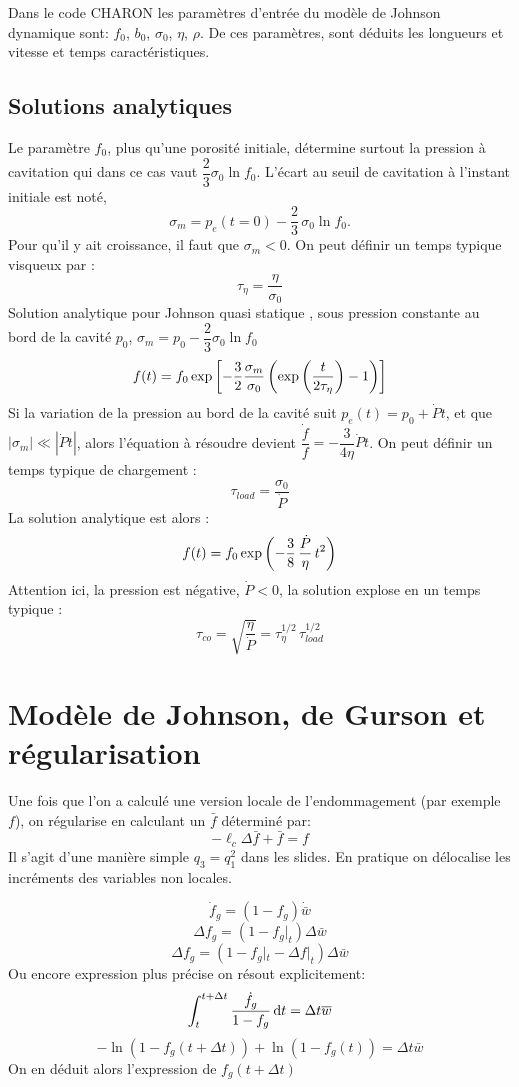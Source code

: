 \documentclass[10pt]{book}
\begin{document}
Dans le code CHARON les paramètres d'entrée du modèle de Johnson dynamique sont: $f_{0}$, $b_{0}$, $\sigma_{0}$, $\eta$, $\rho$. 
De ces paramètres, sont déduits les longueurs et vitesse et temps caractéristiques.
\subsection{Solutions analytiques}
Le paramètre $f_0$, plus qu'une porosité initiale, détermine surtout la pression à cavitation qui dans ce cas vaut $\displaystyle \dfrac{2}{3}\sigma_0 \ln{f_0}$.  L'écart au seuil de cavitation à l'instant initiale est noté,
$$\sigma_m = p_e(t=0)-\dfrac{2}{3}\,\sigma_0\ln{f_0}.$$
Pour qu'il y ait croissance, il faut que $\sigma_m<0$. On peut définir un temps typique visqueux par : 
$$\tau_{\eta}=\dfrac{\eta}{\sigma_0}$$
Solution analytique pour Johnson quasi statique \cite{Duplay_RI2004}, sous pression constante au bord de la cavité $p_0$, $\sigma_m=p_0-\dfrac{2}{3}\sigma_0\ln{f_0}$
$$f(t)=f_0\exp{\left[-\dfrac{3}{2}\dfrac{\sigma_m}{\sigma_0}\left(\exp{\left(\dfrac{t}{2\tau_{\eta}}\right)}-1\right)\right]}$$
Si la variation de la pression au bord de la cavité suit $p_e(t)=p_0+\dot{P}t$, et que $|\sigma_m|\ll |\dot{P}t|$, alors l'équation à résoudre devient $\displaystyle \dfrac{\dot{f}}{f} = -\dfrac{3}{4\eta}\dot{P} t$. On peut définir un temps typique de chargement : 
$$\tau_{load}=\dfrac{\sigma_0}{\dot{P}}$$
La solution analytique est alors :
$$f(t)=f_0\exp{\left(-\dfrac{3}{8}\,\dfrac{\dot{P}}{\eta}\,t^2\right)}$$
Attention ici, la pression est négative, $\dot{P}<0$, la solution explose en un temps typique : 
$$\tau_{co} = \sqrt{\dfrac{\eta}{\dot{P}}}=\tau_{\eta}^{1/2}\,\tau_{load}^{1/2}$$
\section{Modèle de Johnson, de Gurson et régularisation}
Une fois que l'on a calculé une version locale de l'endommagement (par exemple $f$), on régularise en calculant un $\bar{f}$ déterminé par:
$$-\ell_{c}\Delta\bar{f} +\bar{f} = f$$
Il s'agit d'une manière simple 
$q_{3}=q_{1}^{2}$ dans les slides. En pratique on délocalise les incréments des variables non locales. 


$$\dot{f}_g = (1-f_g)\dot{\bar{w}}$$
$$\Delta f_g = (1-f_g|_t)\Delta \bar{w}$$
$$\Delta f_g = (1-f_g|_t-\Delta f|_t)\Delta \bar{w}$$
Ou encore expression plus précise on résout explicitement:
$$\int_t^{t+\Delta t} \dfrac{\dot{f}_g }{1-f_g}\,\mathrm{d}t = \Delta t\overline{w}$$
$$-\ln(1-f_g(t+\Delta t))+\ln(1-f_g(t))= \Delta t\bar{w}$$
On en déduit alors l'expression de $f_g(t+\Delta t)$
\end{document}
